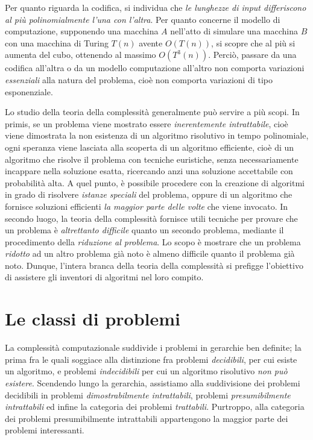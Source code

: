 \documentclass[10pt]{\classname}
\theoremstyle{newlinethm}
\theoremstyle{theorem}
\theoremstyle{definition}
\theoremstyle{definition}
\theoremstyle{definition}
\theoremstyle{definition}
\begin{document}
Per quanto riguarda la codifica, si individua che \emph{le lunghezze di input differiscono al più polinomialmente l'una con l'altra}. Per quanto concerne il modello di computazione, supponendo una macchina $A$ nell'atto di simulare una macchina $B$ con una macchina di Turing $T(n)$ avente $O(T(n))$, si scopre che al più si aumenta del cubo, ottenendo al massimo $O(T^3(n))$. Perciò, passare da una codifica all'altra o da un modello computazione all'altro non comporta variazioni \emph{essenziali} alla natura del problema, cioè non comporta variazioni di tipo esponenziale.

Lo studio della teoria della complessità generalmente può servire a più scopi. In primis, se un problema viene mostrato essere \emph{inerentemente intrattabile}, cioè viene dimostrata la non esistenza di un algoritmo risolutivo in tempo polinomiale, ogni speranza viene lasciata alla scoperta di un algoritmo efficiente, cioè di un algoritmo che risolve il problema con tecniche euristiche, senza necessariamente incappare nella soluzione esatta, ricercando anzi una soluzione accettabile con probabilità alta. A quel punto, è possibile procedere con la creazione di algoritmi in grado di risolvere \emph{istanze speciali} del problema, oppure di un algoritmo che fornisce soluzioni efficienti \emph{la maggior parte delle volte} che viene invocato. In secondo luogo, la teoria della complessità fornisce utili tecniche per provare che un problema è \emph{altrettanto difficile} quanto un secondo problema, mediante il procedimento della \emph{riduzione al problema}. Lo scopo è mostrare che un problema \emph{ridotto} ad un altro problema già noto è almeno difficile quanto il problema già noto. Dunque, l'intera branca della teoria della complessità si prefigge l'obiettivo di assistere gli inventori di algoritmi nel loro compito.

\section{Le classi di problemi}

La complessità computazionale suddivide i problemi in gerarchie ben definite; la prima fra le quali soggiace alla distinzione fra problemi \emph{decidibili}, per cui esiste un algoritmo, e problemi \emph{indecidibili} per cui un algoritmo risolutivo \emph{non può esistere}. Scendendo lungo la gerarchia, assistiamo alla suddivisione dei problemi decidibili in problemi \emph{dimostrabilmente intrattabili}, problemi \emph{presumibilmente intrattabili} ed infine la categoria dei problemi \emph{trattabili}. Purtroppo, alla categoria dei problemi presumibilmente intrattabili appartengono la maggior parte dei problemi interessanti.
\end{document}
